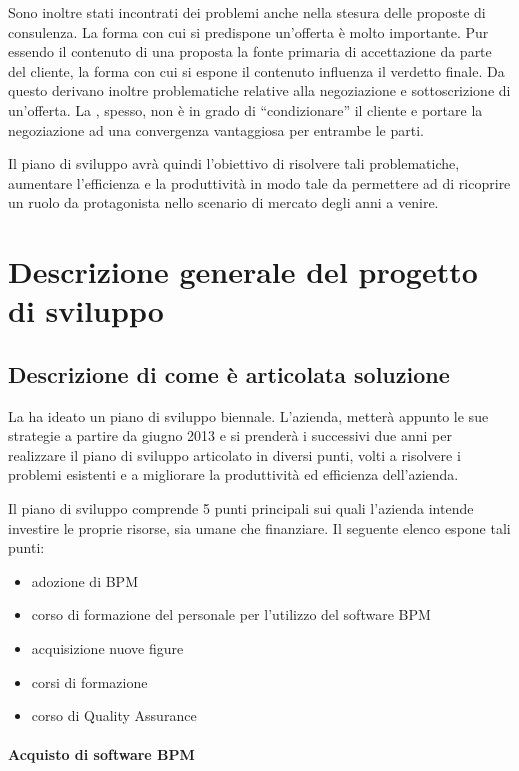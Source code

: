 Sono inoltre stati incontrati dei problemi anche nella stesura delle proposte di consulenza. La forma con cui si predispone un'offerta è molto importante. Pur essendo il contenuto di una proposta la fonte primaria di accettazione da parte del cliente, la forma con cui si espone il contenuto influenza il verdetto finale.
Da questo derivano inoltre problematiche relative alla negoziazione e sottoscrizione di un'offerta. La \customer , spesso, non è in grado di ``condizionare'' il cliente e portare la negoziazione ad una convergenza vantaggiosa per entrambe le parti.

Il piano di sviluppo avrà quindi l'obiettivo di risolvere tali problematiche, aumentare l'efficienza e la produttività in modo tale da permettere ad \customer di ricoprire un ruolo da protagonista nello scenario di mercato degli anni a venire.


\chapter{Descrizione generale del progetto di sviluppo}

\section{Descrizione di come è articolata soluzione}
La \customer ha ideato un piano di sviluppo biennale. L'azienda, metterà appunto le sue strategie a partire da giugno 2013 e si prenderà i successivi due anni per realizzare il piano di sviluppo articolato in diversi punti, volti a risolvere i problemi esistenti e a migliorare la produttività ed efficienza dell'azienda.
		
Il piano di sviluppo comprende 5 punti principali sui quali l'azienda intende investire le proprie risorse, sia umane che finanziare. Il seguente elenco espone tali punti:
	\begin{itemize}
  		\item adozione di  BPM
       \item corso di formazione del personale per l'utilizzo del software BPM
       \item acquisizione nuove figure
       \item corsi di formazione 
        \item corso di Quality Assurance  
     \end{itemize}
	
	
    \subsubsection{Acquisto di software BPM}
    
